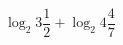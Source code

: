 \begin{ex}[type=calculate]
	\begin{condition}
		\( \log_2 3\dfrac{1}{2}+\log_2 4\dfrac{4}{7} \)
	\end{condition}
\end{ex}
